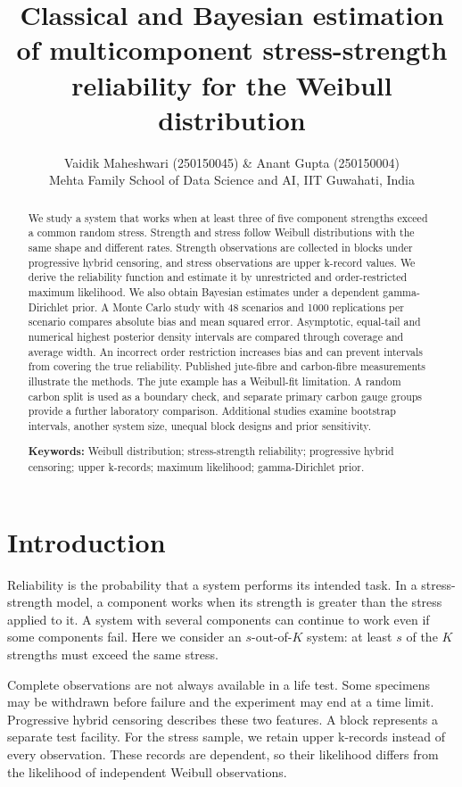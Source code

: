 \documentclass[a4paper,11pt]{article}
\title{Classical and Bayesian estimation of multicomponent stress-strength reliability for the Weibull distribution}
\author{Vaidik Maheshwari (250150045) \& Anant Gupta (250150004)\\[4pt]\small Mehta Family School of Data Science and AI, IIT Guwahati, India}
\date{}
\begin{document}
\begin{singlespace}
\maketitle
\end{singlespace}
\begin{abstract}
We study a system that works when at least three of five component strengths exceed a common random stress. Strength and stress follow Weibull distributions with the same shape and different rates. Strength observations are collected in blocks under progressive hybrid censoring, and stress observations are upper k-record values. We derive the reliability function and estimate it by unrestricted and order-restricted maximum likelihood. We also obtain Bayesian estimates under a dependent gamma-Dirichlet prior. A Monte Carlo study with 48 scenarios and 1000 replications per scenario compares absolute bias and mean squared error. Asymptotic, equal-tail and numerical highest posterior density intervals are compared through coverage and average width. An incorrect order restriction increases bias and can prevent intervals from covering the true reliability. Published jute-fibre and carbon-fibre measurements illustrate the methods. The jute example has a Weibull-fit limitation. A random carbon split is used as a boundary check, and separate primary carbon gauge groups provide a further laboratory comparison. Additional studies examine bootstrap intervals, another system size, unequal block designs and prior sensitivity.

\textbf{Keywords:} Weibull distribution; stress-strength reliability; progressive hybrid censoring; upper k-records; maximum likelihood; gamma-Dirichlet prior.
\end{abstract}

\section{Introduction}\label{sec:introduction}
Reliability is the probability that a system performs its intended task. In a stress-strength model, a component works when its strength is greater than the stress applied to it. A system with several components can continue to work even if some components fail. Here we consider an $s$-out-of-$K$ system: at least $s$ of the $K$ strengths must exceed the same stress.

Complete observations are not always available in a life test. Some specimens may be withdrawn before failure and the experiment may end at a time limit. Progressive hybrid censoring describes these two features. A block represents a separate test facility. For the stress sample, we retain upper k-records instead of every observation. These records are dependent, so their likelihood differs from the likelihood of independent Weibull observations.
\end{document}
